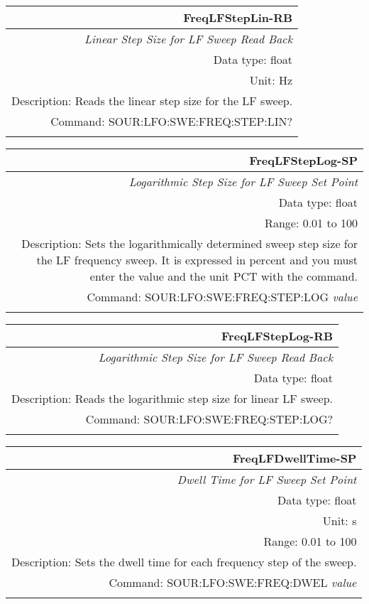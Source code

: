 \documentclass[openany]{article}
\begin{document}
		\begin{tabular}{N}
			\hline
			\bfseries FreqLFStepLin-RB \\ \hline
			\emph{Linear Step Size for LF Sweep Read Back} \\
			Data type: float \\
			Unit: Hz \\
			Description: Reads the linear step size for the LF sweep. \\
			Command: SOUR:LFO:SWE:FREQ:STEP:LIN? \\
			\\

		\end{tabular}


		\begin{tabular}{N}
			\hline
			\bfseries FreqLFStepLog-SP \\ \hline
			\emph{Logarithmic Step Size for LF Sweep Set Point} \\
			Data type: float \\
			Range: 0.01 to 100 \\
			Description: Sets the logarithmically determined sweep step size for the LF frequency sweep. It is expressed in percent and you must enter the value and the unit PCT with the command.\\
			Command: SOUR:LFO:SWE:FREQ:STEP:LOG \emph{value} \\
			\\
			
		\end{tabular}


		\begin{tabular}{N}
			\hline
			\bfseries FreqLFStepLog-RB \\ \hline
			\emph{Logarithmic Step Size for LF Sweep Read Back} \\
			Data type: float \\
			Description: Reads the logarithmic step size for linear LF sweep. \\
			Command: SOUR:LFO:SWE:FREQ:STEP:LOG? \\
			\\

		\end{tabular}


		\begin{tabular}{N}
			\hline
			\bfseries FreqLFDwellTime-SP \\ \hline
			\emph{Dwell Time for LF Sweep Set Point} \\
			Data type: float \\
			Unit: s \\
			Range: 0.01 to 100 \\
			Description: Sets the dwell time for each frequency step of the sweep.\\
			Command: SOUR:LFO:SWE:FREQ:DWEL \emph{value} \\
			\\
			
		\end{tabular}
\end{document}
